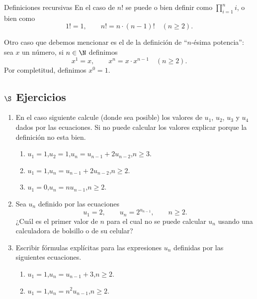 \begin{section}{Definiciones recursivas}
En  el caso de $n!$ se puede  o bien definir como $\prod_{i=1}^{n} i$, o bien como
$$
1!=1,\qquad n!=n \cdot (n-1)! \quad (n\ge 2).
$$

Otro caso que debemos mencionar es  el de la definición de ``$n$-ésima potencia'': sea $x$ un  número, si $n \in \N$ definimos
$$
x^1=x,\qquad x^n= x \cdot x^{n-1} \quad (n\ge 2).
$$
Por completitud,  definimos $x^0=1$. 

\subsection*{$\S$ Ejercicios}
\begin{enumerate}
    \item En el caso siguiente calcule (donde sea posible) los valores de $u_1$, $u_2$, $u_3$ y $u_4$ dados por las ecuaciones. Si no puede calcular los valores explicar porque la definición no esta bien.
    \begin{enumerate}
        \item $u_1 = 1$,\qquad $u_2=1$,\qquad $u_n = u_{n-1} +2 u_{n-2}$,\qquad $n \ge 3$. 
        \item $u_1 = 1$,\qquad $u_n = u_{n-1} +2u_{n-2}$,\qquad $n \ge 2$. 
        \item $u_1 = 0$,\qquad $u_n = nu_{n-1}$,\qquad $n \ge 2$.
    \end{enumerate}

    \item Sea $u_n$ definido por las ecuaciones
    $$
    u_1=2,\qquad u_n= 2^{u_{n-1}}, \qquad n\ge 2.
    $$
    ¿Cuál es el primer valor de $n$ para el cual no se puede calcular $u_n$ usando una calculadora de bolsillo o de su celular?

    \item Escribir fórmulas explícitas para las expresiones $u_n$ definidas por las siguientes ecuaciones.
    \begin{enumerate}
        \item $u_1 = 1$,\qquad $u_n = u_{n-1} +3$,\qquad $n \ge 2$. 
        \item $u_1 = 1$,\qquad $u_n = n^2u_{n-1}$,\qquad $n \ge 2$.
    \end{enumerate}
\end{enumerate}
\end{section}


